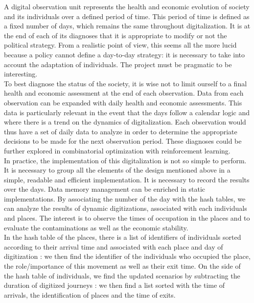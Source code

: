 A digital observation unit represents the health and economic evolution of society and its individuals over a defined period of time. This period of time is defined as a fixed number of days, which remains the same throughout digitalization. It is at the end of each of its diagnoses that it is appropriate to modify or not the political strategy. From a realistic point of view, this seems all the more lucid because a policy cannot define a day-to-day strategy: it is necessary to take into account the adaptation of individuals. The project must be pragmatic to be interesting.\\

To best diagnose the status of the society, it is wise not to limit ourself to a final health and economic assessment at the end of each observation. Data from each observation can be expanded with daily health and economic assessments. This data is particularly relevant in the event that the days follow a calendar logic and where there is a trend on the dynamics of digitalization. Each observation would thus have a set of daily data to analyze in order to determine the appropriate decisions to be made for the next observation period. These diagnoses could be further explored in combinatorial optimization with reinforcement learning.\\

In practice, the implementation of this digitalization is not so simple to perform. It is necessary to group all the elements of the design mentioned above in a simple, readable and efficient implementation. It is necessary to record the results over the days. Data memory management can be enriched in static implementations. By associating the number of the day with the hash tables, we can analyze the results of dynamic digitizations, associated with each individuals and places. The interest is to observe the times of occupation in the places and to evaluate the contaminations as well as the economic stability.\\

In the hash table of the places, there is a list of identifiers of individuals sorted according to their arrival time and associated with each place and day of digitization : we then find the identifier of the individuals who occupied the place, the role/importance of this movement as well as their exit time. On the side of the hash table of individuals, we find the updated scenarios by subtracting the duration of digitized journeys : we then find a list sorted with the time of arrivals, the identification of places and the time of exits.\\

